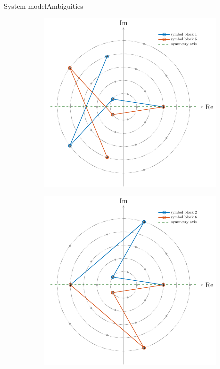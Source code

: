 \documentclass[en]{sdqbeamer}
\begin{document}
\begin{frame}{System model}{Ambiguities}
\begin{figure}[htb]
     \centering
     \begin{subfigure}[b]{0.4\textwidth}
         \centering
         \includegraphics[width=\textwidth]{Eq_class_construction_4.pdf}
     \end{subfigure}
     \hspace{10mm}
     \begin{subfigure}[b]{0.4\textwidth}
         \centering
         \includegraphics[width=\textwidth]{Eq_class_construction_5.pdf}
     \end{subfigure}
\end{figure}

\end{frame}
\end{document}
